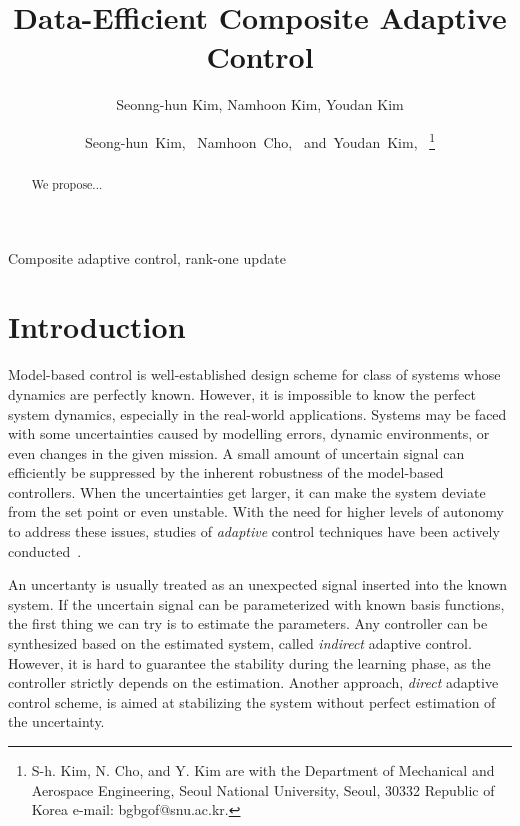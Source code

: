 \documentclass[]{IEEEtran}
\theoremstyle{definition}
\theoremstyle{remark}
\begin{document}
\title{Data-Efficient Composite Adaptive Control}
\author{Seonng-hun Kim, Namhoon Kim, Youdan Kim}
\author{Seong-hun~Kim,~
        Namhoon~Cho,~
        and~Youdan~Kim,~ %
\thanks{S-h. Kim, N. Cho, and Y. Kim are with the Department
of Mechanical and Aerospace Engineering, Seoul National University, Seoul,
30332 Republic of Korea e-mail: bgbgof@snu.ac.kr.}}
\maketitle



\begin{abstract}
	We propose...
\end{abstract}


\begin{IEEEkeywords}
	Composite adaptive control, rank-one update
\end{IEEEkeywords}


\section{Introduction}

Model-based control is well-established design scheme for class of systems whose dynamics are perfectly known.
However, it is impossible to know the perfect system dynamics, especially in the real-world applications.
Systems may be faced with some uncertainties caused by modelling errors, dynamic environments, or even changes in the given mission.
A small amount of uncertain signal can efficiently be suppressed by the inherent robustness of the model-based controllers.
When the uncertainties get larger, it can make the system deviate from the set point or even unstable.
With the need for higher levels of autonomy to address these issues, studies of \textit{adaptive} control techniques have been actively conducted~\cite{astrom_adaptive_1987}.

An uncertanty is usually treated as an unexpected signal inserted into the known system.
If the uncertain signal can be parameterized with known basis functions, the first thing we can try is to estimate the parameters.
Any controller can be synthesized based on the estimated system, called \textit{indirect} adaptive control.
However, it is hard to guarantee the stability during the learning phase, as the controller strictly depends on the estimation.
Another approach, \textit{direct} adaptive control scheme, is aimed at stabilizing the system without perfect estimation of the uncertainty.
\end{document}
